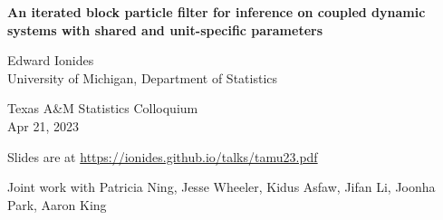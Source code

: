 \documentclass{beamer}
\begin{document}
\begin{frame}
  
\begin{center}
  {\Large\bf An iterated block particle filter for inference on coupled dynamic systems with shared and unit-specific parameters}


\vspace{2mm}

Edward Ionides\\
University of Michigan, Department of Statistics

\vspace{8mm}

Texas A\&M Statistics Colloquium\\
Apr 21, 2023


\hspace{3mm}

Slides are at \url{https://ionides.github.io/talks/tamu23.pdf}

\vspace{8mm}

Joint work with
Patricia Ning, Jesse Wheeler, Kidus Asfaw, Jifan Li, Joonha Park, Aaron King

\end{center}

\end{frame}
\end{document}

